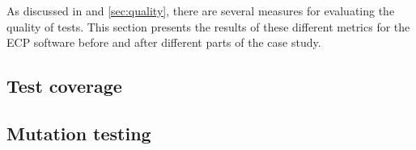 
As discussed in  and \ref{sec:quality}, there are
several measures for evaluating the quality of tests. This section
presents the results of these different metrics for the ECP software
before and after different parts of the case study.\\


\subsection{Test coverage}
    

\subsection{Mutation testing}
    
